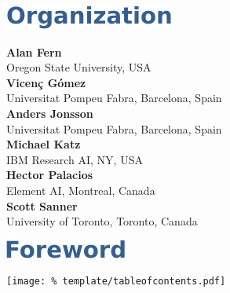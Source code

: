 \documentclass[letterpaper]{article}
\begin{document}

\cleardoublepage

\vspace*{5mm}
\includegraphics[trim={15pt 0pt 0pt 0pt}]{template/organization.pdf}






\vspace*{14mm}
\noindent
\textbf{Alan Fern}\\ 
Oregon State University, USA\\[1em]
\textbf{Vicen\c{c} G\'{o}mez}\\
Universitat Pompeu Fabra, Barcelona, Spain\\[1em]
\textbf{Anders Jonsson}\\
Universitat Pompeu Fabra, Barcelona, Spain\\[1em]
\textbf{Michael Katz}\\
IBM Research AI, NY, USA\\[1em]
\textbf{Hector Palacios}\\
Element AI, Montreal, Canada\\[1em]
\textbf{Scott Sanner}\\
University of Toronto, Toronto, Canada




\clearpage

\vspace*{5mm}
\includegraphics[trim={15pt 0pt 0pt 0pt}]{template/preface.pdf}


\clearpage

\vspace*{5mm}
\texttt{[image: \%
 template/tableofcontents.pdf]}

\renewcommand\contentsname{}
\tableofcontents

\cleardoublepage
{}

\end{document}
